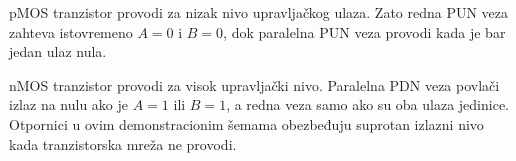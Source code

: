 pMOS tranzistor provodi za nizak nivo upravljačkog ulaza. Zato redna PUN veza zahteva istovremeno $A=0$ i $B=0$, dok paralelna PUN veza provodi kada je bar jedan ulaz nula.

nMOS tranzistor provodi za visok upravljački nivo. Paralelna PDN veza povlači izlaz na nulu ako je $A=1$ ili $B=1$, a redna veza samo ako su oba ulaza jedinice. Otpornici u ovim demonstracionim šemama obezbeđuju suprotan izlazni nivo kada tranzistorska mreža ne provodi.
